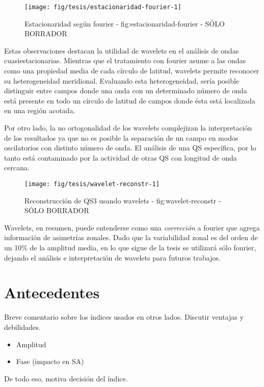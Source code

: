 \documentclass[spanish,a4paper]{book}
\providecommand{\tightlist}{%
  \setlength{\itemsep}{0pt}\setlength{\parskip}{0pt}}
\begin{document}
\begin{figure}
\texttt{[image: fig/tesis/estacionaridad-fourier-1]} \caption{Estacionaridad según fourier - fig:estacionaridad-fourier - SÓLO BORRADOR}\label{fig:estacionaridad-fourier}
\end{figure}

Estas observaciones destacan la utilidad de wavelets en el análisis de
ondas cuasiestacionarias. Mientras que el tratamiento con fourier asume
a las ondas como una propiedad media de cada círculo de latitud,
wavelets permite reconocer su heterogeneidad meridional. Evaluando esta
heterogeneidad, sería posible distinguir entre campos donde una onda con
un determinado número de onda está presente en todo un círculo de
latitud de campos donde ésta está localizada en una región acotada.

Por otro lado, la no ortogonalidad de los wavelets complejizan la
interpretación de los resultados ya que no es posible la separación de
un campo en modos oscilatorios con distinto número de onda. El análisis
de una QS específica, por lo tanto está contaminado por la actividad de
otras QS con longitud de onda cercana.

\begin{figure}
\texttt{[image: fig/tesis/wavelet-reconstr-1]} \caption{Reconstrucción de QS3 usando wavelets - fig:wavelet-reconstr - SÓLO BORRADOR}\label{fig:wavelet-reconstr}
\end{figure}

Wavelets, en resumen, puede entenderse como una \emph{corrección} a
fourier que agrega información de asimetrías zonales. Dado que la
variabilidad zonal es del orden de un 10\% de la amplitud media, en lo
que sigue de la tesis se utilizará sólo fourier, dejando el análisis e
interpretación de wavelets para futuros trabajos.

\section{Antecedentes}\label{antecedentes}

Breve comentario sobre los índices usados en otros lados. Discutir
ventajas y debilidades.

\begin{itemize}
\tightlist
\item
  Amplitud
\item
  Fase (impacto en SA)
\end{itemize}

De todo eso, motiva decisión del índice.
\end{document}

